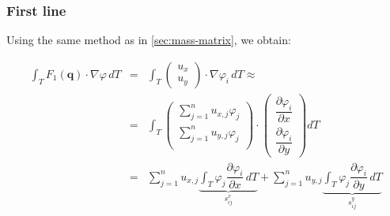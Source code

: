 \documentclass{article}
\newcommand{\pd}[2]{\dfrac{\partial #1}{\partial #2}}
\renewcommand{\phi}{\varphi}
\begin{document}
\subsubsection{First line}
\label{sec:stiffness-matrix-first-line}

Using the same method as in \ref{sec:mass-matrix}, we obtain:

\begin{eqnarray*}
  \int_T F_1(\mathbf{q}) \cdot \nabla \phi \, dT & = &
  \int_T
  \begin{pmatrix}
    u_x \\ u_y
  \end{pmatrix}
  \cdot \nabla \phi_i \, dT \approx \\
  &=& \int_T
  \begin{pmatrix}
    \sum_{j=1}^n u_{x,j} \phi_j \\
    \sum_{j=1}^n u_{y,j} \phi_j \\
  \end{pmatrix}
  \cdot
  \begin{pmatrix}
    \pd{\phi_i}{x} \\
    \pd{\phi_i}{y}
  \end{pmatrix} dT \\
  & = & \sum_{j=1}^n u_{x,j} \underbrace{\int_T \phi_j \pd{\phi_i}{x} \, dT}_{s_{ij}^x} + \sum_{j=1}^n u_{y,j} \underbrace{\int_T \phi_j \pd{\phi_i}{y} \, dT}_{s_{ij}^y}
\end{eqnarray*}
\end{document}
